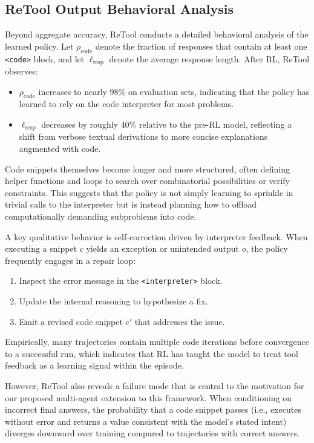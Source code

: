 \documentclass{article}
\begin{document}
\subsection{ReTool Output Behavioral Analysis}
Beyond aggregate accuracy, ReTool conducts a detailed behavioral analysis of the 
learned policy. Let $\rho_\text{code}$ denote the fraction of responses that 
contain at least one \texttt{<code>} block, and let $\ell_\text{resp}$ denote 
the average response length. After RL, ReTool observes:
\begin{itemize}
  \item $\rho_\text{code}$ increases to nearly $98\%$ on evaluation sets, indicating that 
    the policy has learned to rely on the code interpreter for most problems.
  \item $\ell_\text{resp}$ decreases by roughly $40\%$ relative to the pre-RL model, 
    reflecting a shift from verbose textual derivations to more concise explanations 
    augmented with code.
\end{itemize}
Code snippets themselves become longer and more structured, often defining helper 
functions and loops to search over combinatorial possibilities or verify constraints. 
This suggests that the policy is not simply learning to sprinkle in trivial calls to 
the interpreter but is instead planning how to offload computationally 
demanding subproblems into code.

A key qualitative behavior is self-correction driven by interpreter feedback. 
When executing a snippet $c$ yields an exception or unintended output $o$, the 
policy frequently engages in a repair loop:
\begin{enumerate}
  \item Inspect the error message in the \texttt{<interpreter>} block.
  \item Update the internal reasoning to hypothesize a fix.
  \item Emit a revised code snippet $c'$ that addresses the issue.
\end{enumerate}
Empirically, many trajectories contain multiple code iterations before convergence 
to a successful run, which indicates that RL has taught the model to treat tool 
feedback as a learning signal within the episode. 

However, ReTool also reveals a failure mode that is central to the motivation for
our proposed multi-agent extension to this framework. When conditioning on 
incorrect final answers, the probability that a code snippet passes
(i.e., executes without error and returns a value consistent with the 
model's stated intent) diverges downward over training compared to trajectories 
with correct answers.
\end{document}
